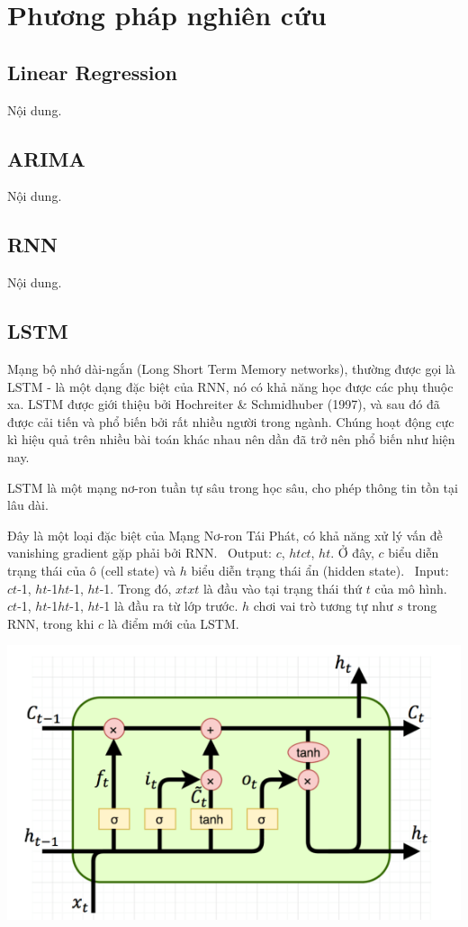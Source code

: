 \section{Phương pháp nghiên cứu}
\subsection{Linear Regression}
Nội dung.

\subsection{ARIMA}
Nội dung.

\subsection{RNN}
Nội dung. 

\subsection{LSTM}
Mạng bộ nhớ dài-ngắn (Long Short Term Memory networks), thường được gọi là LSTM - là một dạng đặc biệt của RNN, nó có khả năng học được các phụ thuộc xa. LSTM được giới thiệu bởi Hochreiter \& Schmidhuber (1997), và sau đó đã được cải tiến và phổ biến bởi rất nhiều người trong ngành. Chúng hoạt động cực kì hiệu quả trên nhiều bài toán khác nhau nên dần đã trở nên phổ biến như hiện nay.
\par
LSTM là một mạng nơ-ron tuần tự sâu trong học sâu, cho phép thông tin tồn tại lâu dài.
\par
Đây là một loại đặc biệt của Mạng Nơ-ron Tái Phát, có khả năng xử lý vấn đề vanishing gradient gặp phải bởi RNN.
    \indent\textbullet\ Output: \(c\), \(htct\), \(ht\). Ở đây, \(c\) biểu diễn trạng thái của ô (cell state) và \(h\) biểu diễn trạng thái ẩn (hidden state).
    \indent\textbullet\ Input: \(ct\)-1, \(ht\)-1\(ht\)-1, \(ht\)-1. Trong đó, \(xtxt\) là đầu vào tại trạng thái thứ \(t\) của mô hình. \(ct\)-1, \(ht\)-1\(ht\)-1, \(ht\)-1 là đầu ra từ lớp trước. \(h\) chơi vai trò tương tự như \(s\) trong RNN, trong khi \(c\) là điểm mới của LSTM.

\begin{minipage}{0.5\textwidth}
\centering
\includegraphics[width=1\textwidth]{resources/chapter-4/lstm-1.png}
\end{minipage}

